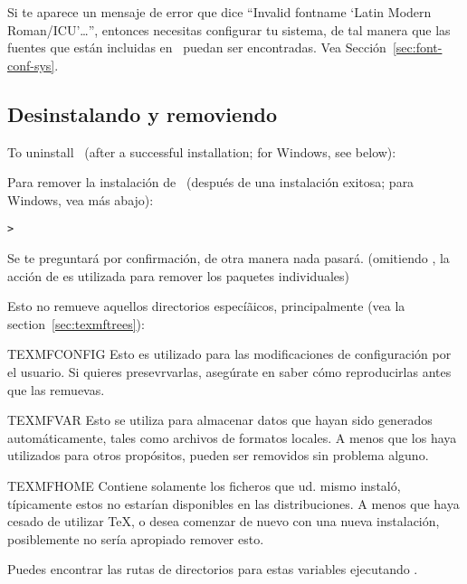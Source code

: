 \documentclass{article}
\begin{document}
\begin{enumerate}
Si te aparece un mensaje de error que dice ``Invalid fontname `Latin
Modern Roman/ICU'\ldots'', entonces necesitas configurar tu sistema,
de tal manera que las fuentes que están incluidas en \TL\ puedan ser
encontradas. Vea 
Sección~\ref{sec:font-conf-sys}.

\end{enumerate}

\subsection{Desinstalando y removiendo \TL}
\label{sec:uninstall}

To uninstall \TL\ (after a successful installation; for Windows, see
below):

Para remover la instalación de \TL\ (después de una instalación exitosa;
para Windows, vea más abajo):

\begin{alltt}
> 
\end{alltt}

Se te preguntará por confirmación, de otra manera nada pasará.
(omitiendo , la acción de   es utilizada
para remover los paquetes individuales)

Esto no remueve aquellos directorios especíãicos, principalmente (vea la
section~\ref{sec:texmftrees}):

\begin{ttdescription}
\item [TEXMFCONFIG] Esto es utilizado para las modificaciones de
configuración por el usuario. Si quieres presevrvarlas, asegúrate en
saber cómo reproducirlas antes que las remuevas.

\item [TEXMFVAR] Esto se utiliza para almacenar datos que hayan sido
generados automáticamente, tales como archivos de formatos locales. A
menos que los haya utilizados para otros propósitos, pueden ser
removidos sin problema alguno.

\item[TEXMFHOME] Contiene solamente los ficheros que ud. mismo instaló,
típicamente estos no estarían disponibles en las distribuciones. A menos
que haya cesado de utilizar \TeX, o desea comenzar de nuevo con una
nueva instalación, posiblemente no sería apropiado remover esto.

\end{ttdescription}

\noindent Puedes encontrar las rutas de directorios para estas variables
ejecutando .
\end{document}
